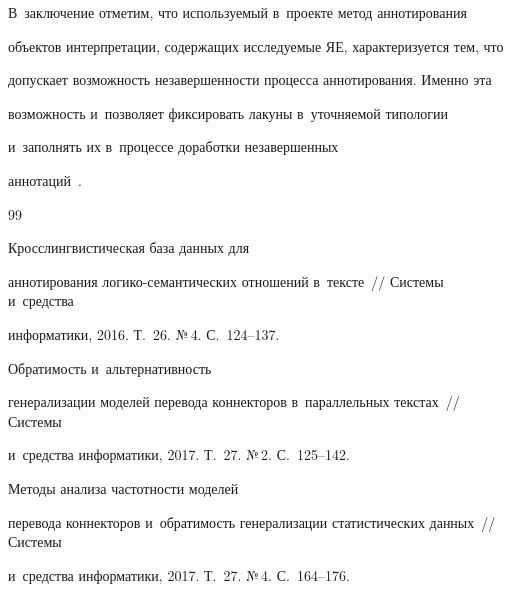   


  В~заключение отметим, что используемый в~проекте метод аннотирования 


объектов интерпретации, содержащих исследуемые ЯЕ, характеризуется тем, что 


допускает возможность незавершенности процесса аннотирования. Именно эта 


возможность и~позволяет фиксировать лакуны в~уточняемой типологии 


и~заполнять их в~процессе доработки незавершенных  


аннотаций~\cite{6-gz, 24-gz}.


     


{\small\frenchspacing


{%




\begin{thebibliography}{99}







 Кросслингвистическая база данных для 


аннотирования логико-семантических отношений в~тексте~/\!\!/ Системы и~средства 


информатики, 2016. Т.~26. №\,4. С.~124--137.




 Обратимость и~альтернативность 


генерализации моделей перевода коннекторов в~параллельных текстах~/\!\!/ Системы 


и~средства информатики, 2017. Т.~27. №\,2. С.~125--142.







 Методы анализа частотности моделей 


перевода коннекторов и~обратимость генерализации статистических данных~/\!\!/ Системы 


и~средства информатики, 2017. Т.~27. №\,4. С.~164--176.








\end{thebibliography}}}
